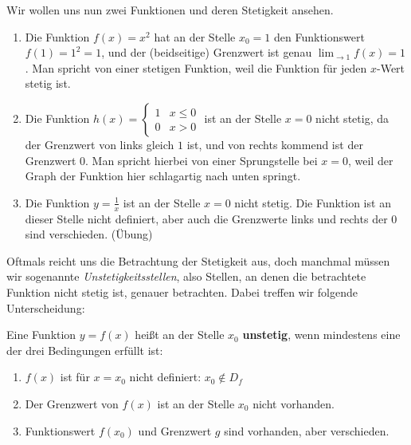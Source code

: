 \documentclass[ngerman, 12pt]{nssheetxea}
\begin{document}
\begin{example}
Wir wollen uns nun zwei Funktionen und deren Stetigkeit ansehen.
\begin{enumerate}
\item Die Funktion $f(x)=x^2$ hat an der Stelle $x_0=1$ den Funktionswert $f(1)=1^2=1$, und der (beidseitige) Grenzwert ist genau $\lim_{\rightarrow 1} f(x)=1$. Man spricht von einer stetigen Funktion, weil die Funktion für jeden $x$-Wert stetig ist.
\item Die Funktion $h(x)=\begin{cases} 1 & x \leq 0 \\ 0 & x>0   \end{cases}$ ist an der Stelle $x=0$ nicht stetig, da der Grenzwert von links gleich $1$ ist, und von rechts kommend ist der Grenzwert $0$. Man spricht hierbei von einer Sprungstelle bei $x=0$, weil der Graph der Funktion hier schlagartig nach unten springt.

\begin{center}
\end{center}
\item Die Funktion $y=\frac{1}{x}$ ist an der Stelle $x=0$ nicht stetig. Die Funktion ist an dieser Stelle nicht definiert, aber auch die Grenzwerte links und rechts der $0$ sind verschieden. (Übung)
\end{enumerate}
\end{example}

Oftmals reicht uns die Betrachtung der Stetigkeit aus, doch manchmal müssen wir sogenannte \textit{Unstetigkeitsstellen}, also Stellen, an denen die betrachtete Funktion nicht stetig ist, genauer betrachten. Dabei treffen wir folgende Unterscheidung:

\begin{definition}
Eine Funktion $y=f(x)$ heißt an der Stelle $x_0$ \textbf{unstetig}, wenn mindestens eine der drei Bedingungen erfüllt ist:
\begin{enumerate}
\item $f(x)$ ist für $x=x_0$ nicht definiert: $x_0 \notin D_f$
\item Der Grenzwert von $f(x)$ ist an der Stelle $x_0$ nicht vorhanden.
\item Funktionswert $f(x_0)$ und Grenzwert $g$ sind vorhanden, aber verschieden.
\end{enumerate}
\end{definition}
\end{document}

